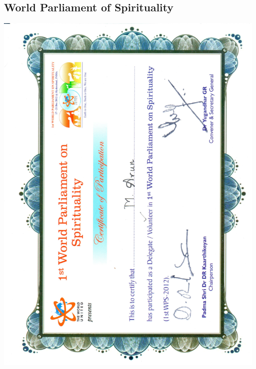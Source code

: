 \documentclass{article}
\begin{document}
	\subsection{World Parliament of Spirituality}
		\includegraphics[page=1, scale=0.5]{proofs/wps.pdf}\\
\end{document}
